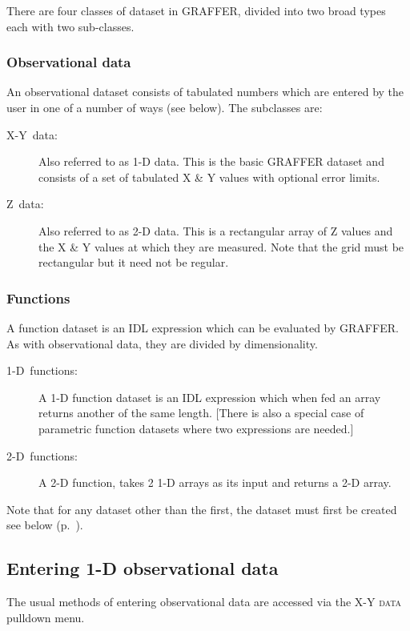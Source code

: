 \documentclass[11pt,twoside,english]{article}
\begin{document}
There are four classes of dataset in GRAFFER, divided into two broad
types each with two sub-classes.


\subsubsection{Observational data }

An observational dataset consists of tabulated numbers which are
entered by the user in one of a number of ways (see below). The
subclasses are:

\begin{description}
\item [X-Y~data:]Also referred to as 1-D data. This is the basic
  GRAFFER dataset and consists of a set of tabulated X \& Y values with
  optional error limits.
\item [Z~data:]Also referred to as 2-D data. This is a rectangular
  array of Z values and the X \& Y values at which they are
  measured. Note that the grid must be rectangular but it need not be
  regular.
\end{description}

\subsubsection{Functions }

A function dataset is an IDL expression which can be evaluated by
GRAFFER. As with observational data, they are divided by
dimensionality.

\begin{description}
\item [1-D~functions:]A 1-D function dataset is an IDL expression which
  when fed an array returns another of the same length. {[}There is
  also a special case of parametric function datasets where two
  expressions are needed.{]}
\item [2-D~functions:]A 2-D function, takes 2 1-D arrays as its input
  and returns a 2-D array.
\end{description}
Note that for any dataset other than the first, the dataset must first
be created see below (p.~\pageref{make-new-ds}).


\subsection{Entering 1-D observational data\label{enter-1d}}

The usual methods of entering observational data are accessed via the
\textsc{X-Y data} pulldown menu.
\end{document}
